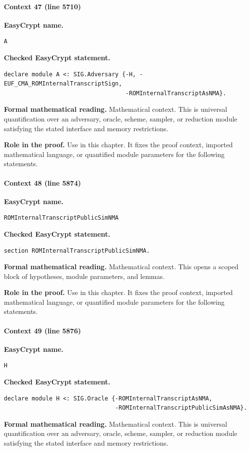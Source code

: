 \paragraph{Context 47 (line 5710)}
\noindent\textbf{EasyCrypt name.}
\begin{lstlisting}[language=EasyCrypt,basicstyle=\ttfamily\scriptsize]
A
\end{lstlisting}
\noindent\textbf{Checked EasyCrypt statement.}
\begin{lstlisting}[language=EasyCrypt,basicstyle=\ttfamily\scriptsize]
declare module A <: SIG.Adversary {-H, -EUF_CMA_ROMInternalTranscriptSign,
                                   -ROMInternalTranscriptAsNMA}.
\end{lstlisting}
\noindent\textbf{Formal mathematical reading.}
Mathematical context. This is universal quantification over an adversary, oracle, scheme, sampler, or reduction module satisfying the stated interface and memory restrictions.

\noindent\textbf{Role in the proof.}
Use in this chapter. It fixes the proof context, imported mathematical language, or quantified module parameters for the following statements.

\paragraph{Context 48 (line 5874)}
\noindent\textbf{EasyCrypt name.}
\begin{lstlisting}[language=EasyCrypt,basicstyle=\ttfamily\scriptsize]
ROMInternalTranscriptPublicSimNMA
\end{lstlisting}
\noindent\textbf{Checked EasyCrypt statement.}
\begin{lstlisting}[language=EasyCrypt,basicstyle=\ttfamily\scriptsize]
section ROMInternalTranscriptPublicSimNMA.
\end{lstlisting}
\noindent\textbf{Formal mathematical reading.}
Mathematical context. This opens a scoped block of hypotheses, module parameters, and lemmas.

\noindent\textbf{Role in the proof.}
Use in this chapter. It fixes the proof context, imported mathematical language, or quantified module parameters for the following statements.

\paragraph{Context 49 (line 5876)}
\noindent\textbf{EasyCrypt name.}
\begin{lstlisting}[language=EasyCrypt,basicstyle=\ttfamily\scriptsize]
H
\end{lstlisting}
\noindent\textbf{Checked EasyCrypt statement.}
\begin{lstlisting}[language=EasyCrypt,basicstyle=\ttfamily\scriptsize]
declare module H <: SIG.Oracle {-ROMInternalTranscriptAsNMA,
                                -ROMInternalTranscriptPublicSimAsNMA}.
\end{lstlisting}
\noindent\textbf{Formal mathematical reading.}
Mathematical context. This is universal quantification over an adversary, oracle, scheme, sampler, or reduction module satisfying the stated interface and memory restrictions.

